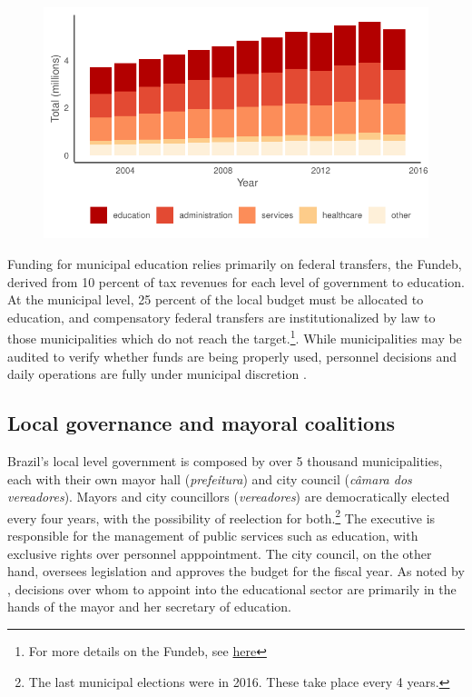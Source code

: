 \documentclass[12pt,a4paper]{article}
\begin{document}
\begin{figure}[h]
    \centering
    \includegraphics[width=0.6\linewidth]{plots/descriptive_staff_breakdown}
\end{figure}

Funding for municipal education relies primarily on federal transfers, the Fundeb, derived from 10 percent of tax revenues for each level of government to education. At the municipal level, 25 percent of the local budget must be allocated to education, and compensatory federal transfers are institutionalized by law to those municipalities which do not reach the target.\footnote{For more details on the Fundeb, see \hyperlink{https://www.fnde.gov.br/index.php/financiamento/fundeb/sobre-o-plano-ou-programa/sobre-o-fundeb}{here}}. While municipalities may be audited to verify whether funds are being properly used, personnel decisions and daily operations are fully under municipal discretion \citet{ferraz_corrupting_2012}.

\subsection{Local governance and mayoral coalitions}

Brazil's local level government is composed by over 5 thousand municipalities, each with their own mayor hall (\emph{prefeitura}) and city council (\emph{c\^{a}mara dos vereadores}). Mayors and city councillors (\textit{vereadores}) are democratically elected every four years, with the possibility of reelection for both.\footnote{The last municipal elections were in 2016. These take place every 4 years.} The executive is responsible for the management of public services such as education, with exclusive rights over personnel apppointment. The city council, on the other hand, oversees legislation and approves the budget for the fiscal year. As noted by \citet{souza_reforma_2004}, decisions over whom to appoint into the educational sector are primarily in the hands of the mayor and her secretary of education.
\end{document}
